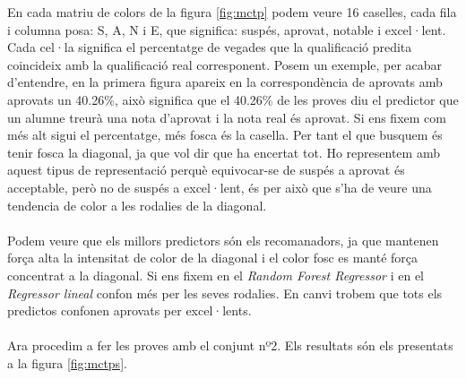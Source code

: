 \documentclass[12pt,a4paper,catalan]{article}
\begin{document}
En cada matriu de colors de la figura \ref{fig:mctp} podem veure 16 caselles, cada fila i columna posa: S, A, N i E, que significa: suspés, aprovat, notable i excel·lent. Cada cel·la significa el percentatge de vegades que la qualificació predita coincideix amb la qualificació real corresponent. Posem un exemple, per acabar d'entendre, en la primera figura apareix en la correspondència de aprovats amb aprovats un 40.26\%, això significa que el 40.26\% de les proves diu el predictor que un alumne treurà una nota d'aprovat i la nota real és aprovat. Si ens fixem com més alt sigui el percentatge, més fosca és la casella. Per tant el que busquem és tenir fosca la diagonal, ja que vol dir que ha encertat tot. Ho representem amb aquest tipus de representació perquè equivocar-se de suspés a aprovat és acceptable, però no de suspés a excel·lent, és per això que s'ha de veure una tendencia de color a les rodalies de la diagonal.
\\
\\
Podem veure que els millors predictors són els recomanadors, ja que mantenen força alta la intensitat de color de la diagonal i el color fosc es manté força concentrat a la diagonal. Si ens fixem en el \textit{Random Forest Regressor} i en el \textit{Regressor lineal} confon més per les seves rodalies. En canvi trobem que tots els predictos confonen aprovats per excel·lents.
\\
\\
Ara procedim a fer les proves amb el conjunt nº2. Els resultats són els presentats a la figura \ref{fig:mctps}.
\end{document}
